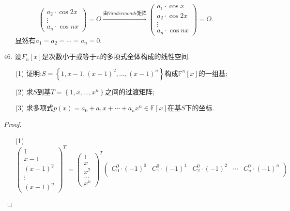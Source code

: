 \documentclass{article}
\begin{document}
\begin{enumerate}
\begin{enumerate}
\[\begin{pmatrix}
                a_2\cdot \cos 2x \\
                \vdots\\
                a_n\cdot \cos nx
            \end{pmatrix}=O
            \xrightarrow{\mbox{由$Vandermonde$矩阵}}
            \begin{pmatrix}
                a_1\cdot \cos x\\
                a_2\cdot \cos 2x \\
                \vdots\\
                a_n\cdot \cos nx
            \end{pmatrix}=O.
        \]
        显然有$a_1=a_2=\cdots=a_n=0$.
    \end{enumerate}
    \item [46.]设$F_n [x]$是次数小于或等于n的多项式全体构成的线性空间.
    \begin{enumerate}
        \item [(1)]证明:$ S=\left\{1,x-1,{(x-1)}^2,\ldots,{(x-1)}^n\right\}$构成$\mathbb{F}^n [x]$的一组基;
        \item [(2)]求$S$到基$T=\left\{1,x,\ldots,x^n\right\}$之间的过渡矩阵;
        \item [(3)]求多项式$p(x)=a_0+a_1 x+\cdots+a_n x^n \in \mathbb{F}[x]$在基$S$下的坐标.
    \end{enumerate}
    \begin{proof}
        \begin{enumerate}
            \item []
            \item [(1)]
            \[
                {\begin{pmatrix}
                    1 \\ x-1 \\ {(x-1)}^2 \\ \vdots \\{(x-1)}^n
                \end{pmatrix}}^T
                =
                {\begin{pmatrix}
                    1 \\ x \\ x^2 \\ \ldots \\ x^n
                \end{pmatrix}}^T
                \begin{pmatrix}
                    C_{0}^{0}\cdot{(-1)}^{0} & C_{1}^{0}\cdot {(-1)}^{1} & C_{2}^{0}\cdot {(-1)}^{2} & \cdots & C_{n}^{0}\cdot {(-1)}^{n}\\

\end{pmatrix}\]
\end{enumerate}
\end{proof}
\end{enumerate}
\end{document}
